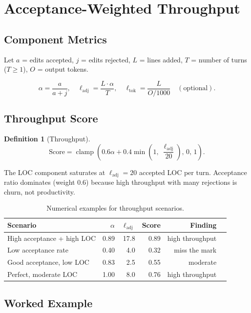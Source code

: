 \documentclass[11pt,a4paper]{article}
\newtheorem{definition}{Definition}
\newcommand{\clamp}[3]{\operatorname{clamp}\!\left(#1,\,#2,\,#3\right)}
\begin{document}
\section{Acceptance-Weighted Throughput}
\label{sec:throughput}

\subsection{Component Metrics}

Let $a$ = edits accepted, $j$ = edits rejected, $L$ = lines added,
$T$ = number of turns ($T \geq 1$), $O$ = output tokens.

\[
  \alpha = \frac{a}{a+j}, \quad
  \ell_{\text{adj}} = \frac{L \cdot \alpha}{T}, \quad
  \ell_{\text{tok}} = \frac{L}{O/1000} \quad (\text{optional}).
\]

\subsection{Throughput Score}

\begin{definition}[Throughput]
\[
  \boxed{\text{Score} = \clamp{0.6\alpha + 0.4\min\!\left(1,\;\frac{\ell_{\text{adj}}}{20}\right)}{0}{1}.}
\]
\end{definition}

The LOC component saturates at $\ell_{\text{adj}} = 20$ accepted LOC per turn.
Acceptance ratio dominates (weight 0.6) because high throughput with many
rejections is churn, not productivity.

\begin{table}[h!]
\centering
\caption{Numerical examples for throughput scenarios.}
\begin{tabular}{@{}lrrrrr@{}}
\toprule
Scenario & $\alpha$ & $\ell_{\text{adj}}$ & Score & Finding \\
\midrule
High acceptance + high LOC & 0.89 & 17.8 & 0.89 & high throughput \\
Low acceptance rate & 0.40 & 4.0 & 0.32 & miss the mark \\
Good acceptance, low LOC & 0.83 & 2.5 & 0.55 & moderate \\
Perfect, moderate LOC & 1.00 & 8.0 & 0.76 & high throughput \\
\bottomrule
\end{tabular}
\end{table}

\subsection{Worked Example}
\label{sec:throughput-example}
\end{document}
